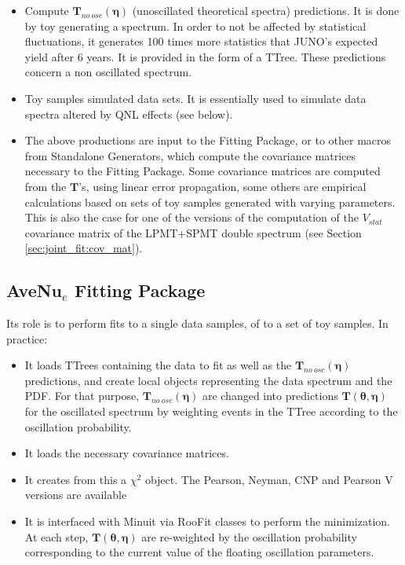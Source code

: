 \documentclass[../main.tex]{subfiles}
\begin{document}
\begin{itemize}
  \item Compute $\bm{T}_{no~osc}(\bm{\eta})$ (unoscillated theoretical spectra) predictions. It is done by toy generating a spectrum. In order to not be affected by statistical fluctuations, it generates 100 times more statistics that JUNO's expected yield after 6 years. It is provided in the form of a TTree. These predictions concern a non oscillated spectrum.

  \item Toy samples simulated data sets. It is essentially used to simulate data spectra altered by QNL effects (see below).

  \item The above productions are input to the Fitting Package, or to other macros from Standalone Generators, which compute the covariance matrices necessary to the Fitting Package. Some covariance matrices are computed from the $\bm{T}$'s, using linear error propagation, some others are empirical calculations based on sets of toy samples generated with varying parameters. This is also the case for one of the versions of the computation of the $V_{stat}$ covariance matrix of the LPMT+SPMT double spectrum (see Section \ref{sec:joint_fit:cov_mat}).
\end{itemize}



\subsection{AveNu$_e$ Fitting Package}
\label{sec:joint_fit:avenue_fit}

Its role is to perform fits to a single data samples, of to a set of toy samples. In practice:

\begin{itemize}
  \item It loads TTrees containing the data to fit as well as the $\bm{T}_{no~osc}(\bm{\eta})$ predictions, and create local objects representing the data spectrum and the PDF. For that purpose, $\bm{T}_{no~osc}(\bm{\eta})$ are changed into predictions $\bm{T}(\bm{\theta},\bm{\eta})$ for the oscillated spectrum by weighting events in the TTree according to the oscillation probability.
  \item It loads the necessary covariance matrices.
  \item It creates from this a $\chi^2$ object. The Pearson, Neyman, CNP and Pearson V versions are available

  \item It is interfaced with Minuit via RooFit classes to perform the minimization. At each step, $\bm{T}(\bm{\theta},\bm{\eta})$ are re-weighted by the oscillation probability corresponding to the current value of the floating oscillation parameters.
\end{itemize}
\hfill
\end{document}
